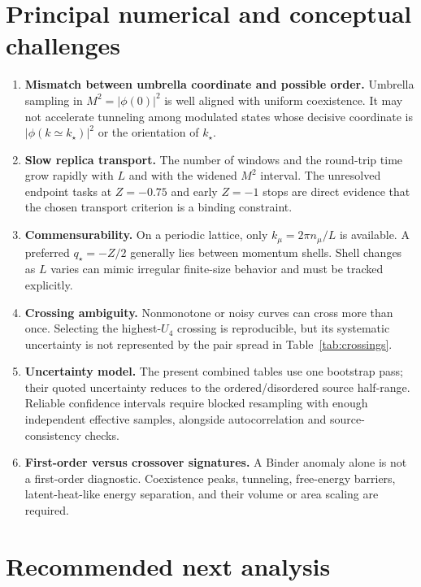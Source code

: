 \documentclass[11pt]{article}
\newcommand{\Ufour}{U_4}
\newcommand{\kstar}{k_\star}
\newcommand{\qstar}{q_\star}
\begin{document}
\section{Principal numerical and conceptual challenges}

\begin{enumerate}
  \item \textbf{Mismatch between umbrella coordinate and possible order.}
  Umbrella sampling in $M^2=|\phi(0)|^2$ is well aligned with uniform
  coexistence.  It may not accelerate tunneling among modulated states whose
  decisive coordinate is $|\phi(k\simeq\kstar)|^2$ or the orientation of
  $\kstar$.

  \item \textbf{Slow replica transport.}
  The number of windows and the round-trip time grow rapidly with $L$ and with
  the widened $M^2$ interval.  The unresolved endpoint tasks at $Z=-0.75$ and
  early $Z=-1$ stops are direct evidence that the chosen transport criterion
  is a binding constraint.

  \item \textbf{Commensurability.}
  On a periodic lattice, only $k_\mu=2\pi n_\mu/L$ is available.  A preferred
  $\qstar=-Z/2$ generally lies between momentum shells.  Shell changes as $L$
  varies can mimic irregular finite-size behavior and must be tracked
  explicitly.

  \item \textbf{Crossing ambiguity.}
  Nonmonotone or noisy curves can cross more than once.  Selecting the
  highest-$\Ufour$ crossing is reproducible, but its systematic uncertainty is
  not represented by the pair spread in Table~\ref{tab:crossings}.

  \item \textbf{Uncertainty model.}
  The present combined tables use one bootstrap pass; their quoted
  uncertainty reduces to the ordered/disordered source half-range.  Reliable
  confidence intervals require blocked resampling with enough independent
  effective samples, alongside autocorrelation and source-consistency checks.

  \item \textbf{First-order versus crossover signatures.}
  A Binder anomaly alone is not a first-order diagnostic.  Coexistence peaks,
  tunneling, free-energy barriers, latent-heat-like energy separation, and
  their volume or area scaling are required.
\end{enumerate}

\section{Recommended next analysis}
\end{document}
